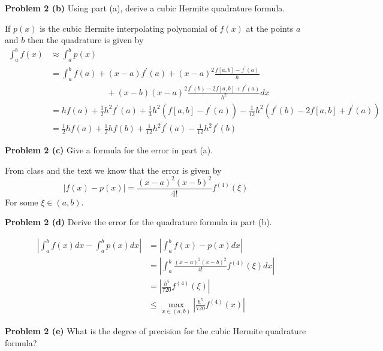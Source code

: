 \documentclass[12pt]{article}
\newcommand{\problem}[1]{\hspace{-4 ex} \large \textbf{Problem #1} }
\begin{document}
\bigbreak
\problem{2 (b)} Using part (a), derive a cubic Hermite quadrature formula. \bigbreak

	If $p(x)$ is the cubic Hermite interpolating polynomial of $f(x)$ at the points $a$ and $b$ then the quadrature is given by
	\begin{align*}
		\int_a^b f(x) & \approx \int_a^b p(x) \\
		& = \int_a^b f(a) + (x-a)f^\prime(a) + (x-a)^2 \frac{f[a,b]-f^\prime(a)}{h} \\
		& \phantom{=====} + (x-b)(x-a)^2 \frac{f^\prime(b) - 2f[a,b] + f^\prime(a)}{h^2} dx \\
		& = hf(a) + \tfrac{1}{2}h^2f^\prime(a) + \tfrac{1}{3}h^2 (f[a,b]-f^\prime(a)) - \tfrac{1}{12}h^2 (f^\prime(b) - 2f[a,b] + f^\prime(a)) \\
		& = \tfrac{1}{2}hf(a) + \tfrac{1}{2}hf(b) + \tfrac{1}{12}h^2f^\prime(a) - \tfrac{1}{12}h^2f^\prime(b)
	\end{align*}
	
\bigbreak
\problem{2 (c)} Give a formula for the error in part (a). \bigbreak 

	From class and the text we know that the error is given by
	$$
	\vert f(x) - p(x) \vert = \frac{(x-a)^2(x-b)^2}{4!}f^{(4)}(\xi)
	$$
	For some $\xi \in (a,b)$.
	
\bigbreak
\problem{2 (d)} Derive the error for the quadrature formula in part (b). \bigbreak

	\begin{align*}
		\left \vert \int_a^b f(x) dx - \int_a^b p(x) dx \right \vert &= \left \vert \int_a^b f(x) - p(x) dx \right \vert \\
		& = \left \vert \int_a^b \frac{(x-a)^2(x-b)^2}{4!}f^{(4)}(\xi) dx \right \vert \\
		& = \left \vert \frac{h^5}{720}f^{(4)}(\xi) \right \vert \\
		& \leq \max_{x \in (a,b)}\left \vert \frac{h^5}{720}f^{(4)}(x) \right \vert
	\end{align*}
	
\bigbreak
\problem{2 (e)} What is the degree of precision for the cubic Hermite quadrature formula? \bigbreak
\end{document}
